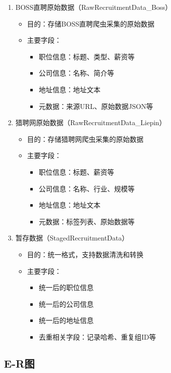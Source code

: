 \begin{enumerate}
  \item BOSS直聘原始数据（RawRecruitmentData\_Boss）
  \begin{itemize}
    \item 目的：存储BOSS直聘爬虫采集的原始数据
    \item 主要字段：
    \begin{itemize}
      \item 职位信息：标题、类型、薪资等
      \item 公司信息：名称、简介等
      \item 地址信息：地址文本
      \item 元数据：来源URL、原始数据JSON等
    \end{itemize}
  \end{itemize}

  \item 猎聘网原始数据（RawRecruitmentData\_Liepin）
  \begin{itemize}
    \item 目的：存储猎聘网爬虫采集的原始数据
    \item 主要字段：
    \begin{itemize}
      \item 职位信息：标题、薪资等
      \item 公司信息：名称、行业、规模等
      \item 地址信息：地址文本
      \item 元数据：标签列表、原始数据等
    \end{itemize}
  \end{itemize}

  \item 暂存数据（StagedRecruitmentData）
  \begin{itemize}
    \item 目的：统一格式，支持数据清洗和转换
    \item 主要字段：
    \begin{itemize}
      \item 统一后的职位信息
      \item 统一后的公司信息
      \item 统一后的地址信息
      \item 去重相关字段：记录哈希、重复组ID等
    \end{itemize}
  \end{itemize}
\end{enumerate}

\subsection{E-R图}

